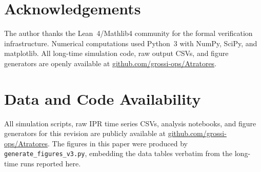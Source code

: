 \documentclass[12pt,a4paper]{article}
\begin{document}
\section*{Acknowledgements}

The author thanks the Lean~4/Mathlib4 community for the formal verification
infrastructure. Numerical computations used Python~3 with NumPy, SciPy, and
matplotlib. All long-time simulation code, raw output CSVs, and figure
generators are openly available at
\href{https://github.com/grossi-ops/Atratores}{github.com/grossi-ops/Atratores}.

\section*{Data and Code Availability}

All simulation scripts, raw IPR time series CSVs, analysis notebooks, and
figure generators for this revision are publicly available at
\href{https://github.com/grossi-ops/Atratores}{github.com/grossi-ops/Atratores}.
The figures in this paper were produced by
\texttt{generate\_figures\_v3.py}, embedding the data tables verbatim from
the long-time runs reported here.
\end{document}
